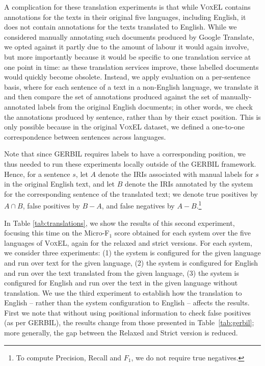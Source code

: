 \documentclass{llncs}
\begin{document}
A complication for these translation experiments is that while \textsc{VoxEL} contains annotations for the texts in their original five languages, including English, it does not contain annotations for the texts translated to English. While we considered manually annotating such documents produced by Google Translate, we opted against it partly due to the amount of labour it would again involve, but more importantly because it would be specific to one translation service at one point in time: as these translation services improve, these labelled documents would quickly become obsolete. Instead, we apply evaluation on a per-sentence basis, where for each sentence of a text in a non-English language, we translate it and then compare the set of annotations produced against the set of manually-annotated labels from the original English documents; in other words, we check the annotations produced by sentence, rather than by their exact position. This is only possible because in the original \textsc{VoxEL} dataset, we defined a one-to-one correspondence between sentences across languages. 

Note that since GERBIL requires labels to have a corresponding position, we thus needed to run these experiments locally outside of the GERBIL framework. Hence, for a sentence $s$, let $A$ denote the IRIs associated with manual labels for $s$ in the original English text, and let $B$ denote the IRIs annotated by the system for the corresponding sentence of the translated text; we denote true positives by $A \cap B$, false positives by $B - A$, and false negatives by $A - B$.\footnote{To compute Precision, Recall and $F_1$, we do not require true negatives.}

\newcommand{\blank}{\underline{\hspace{0.5em}}}

In Table \ref{tab:translations}, we show the results of this second experiment, focusing this time on the Micro-F$_1$ score obtained for each system over the five languages of \textsc{VoxEL}, again for the relaxed and strict versions. For each system, we consider three experiments: (1) the system is configured for the given language and run over text for the given language, (2) the system is configured for English and run over the text translated from the given language, (3) the system is configured for English and run over the text in the given language without translation. We use the third experiment to establish how the translation to English -- rather than the system configuration to English -- affects the results. First we note that without using positional information to check false positives (as per GERBIL), the results change from those presented in Table~\ref{tab:gerbil}; more generally, the gap between the Relaxed and Strict version is reduced. 
\end{document}
